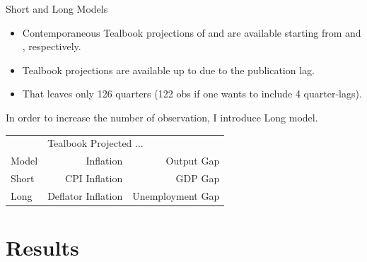 \documentclass[10pt,aspectratio=169]{beamer}
\begin{document}
\begin{frame}{Short and Long Models}
    \begin{itemize}
        \item Contemporaneous Tealbook projections of  and  are available starting from  and , respectively. 
        \item Tealbook projections are available up to  due to the publication lag.
        \item That leaves only 126 quarters (122 obs if one wants to include 4 quarter-lags).
    \end{itemize}

    In order to increase the number of observation, I introduce Long model.

    \begin{table}[!h]\centering \small
    \begin{tabular}{lrr}\hline\hline
        &\multicolumn{2}{l}{Tealbook Projected ...}\\ \cline{2-3} 
        Model &  Inflation & Output Gap\\ 
        \hline
        Short & CPI Inflation & GDP Gap\\ 
        Long& Deflator Inflation & Unemployment Gap\\ \hline\hline
    \end{tabular}
    \end{table}

\end{frame}










    




\section{Results}
\end{document}
